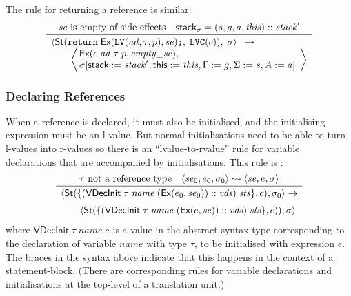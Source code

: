 \documentclass[11pt]{article}
\begin{document}
The rule for returning a reference  is similar:
\[
\infer{%
  \begin{array}[t]{l}
    \statebrack{\textsf{St}(\ckey{return}\;\textsf{Ex}(\clvalue(\mathit{ad},\tau,p),
      \mathit{se})\ckey{;},\;\ckey{LVC}(c)),
      \;\sigma}%
    \;\;\rightarrow\\
    \qquad\left\langle\!\!\begin{array}{l}
      \textsf{Ex}(c\;\mathit{ad}\;\tau\;p,\mathit{empty\_se}),\\
      \sigma[\textsf{stack} := \mathit{stack}', \textsf{this} :=
      \mathit{this}, \Gamma := g, \Sigma := s, A
      := a]\end{array}\right\rangle
  \end{array}}{
  \mathit{se}\mbox{ is empty of side effects} & \textsf{stack}_\sigma = (s,g,a,\mathit{this})
  :: \mathit{stack}'}
\]

\subsubsection{Declaring References}

When a reference is declared, it must also be initialised, and the
initialising expression must be an l-value.  But normal
initialisations need to be able to turn l-values into r-values so
there is an ``lvalue-to-rvalue'' rule for variable declarations that
are accompanied by initialisations.  This rule is
:
\[
\infer{\begin{array}{l}
    \statebrack{\textsf{St}(\mathbf{\{}
  (\textsf{VDecInit}\;\tau\;\mathit{name}\;(\textsf{Ex}(e_0,\mathit{se}_0))
  :: \mathit{vds})\;\mathit{sts} \mathbf{\}}, c),\sigma_0}
\rightarrow\\[2mm]
\qquad\statebrack{\textsf{St}(\mathbf{\{}
  (\textsf{VDecInit}\;\tau\;\mathit{name}\;(\textsf{Ex}(e,\mathit{se}))
  :: \mathit{vds})\;\mathit{sts} \mathbf{\}}, c)),\sigma}\end{array}}{
\tau \mbox{ not a reference type} &
\statebrack{\mathit{se}_0,e_0,\sigma_0}\lvtorv
  \statebrack{\mathit{se},e,\sigma}}
\]
where $\textsf{VDecInit}\;\tau\;\mathit{name}\;e$ is a value in the
abstract syntax type corresponding to the declaration of variable
$\mathit{name}$ with type $\tau$, to be initialised with expression
$e$.  The braces in the syntax above indicate that this happens in the
context of a statement-block.  (There are corresponding rules for
variable declarations and initialisations at the top-level of a
translation unit.)
\end{document}
